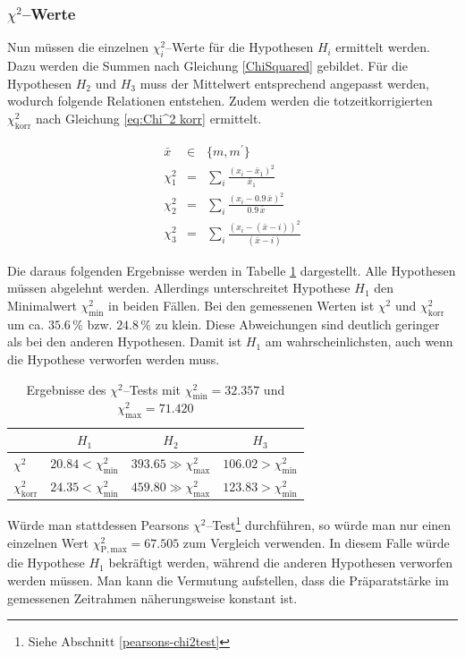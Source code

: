 \documentclass[12pt,a4paper]{scrartcl}
\numberwithin{equation}{section} %
\begin{document}
\subsubsection{$\chi^2$--Werte}
Nun müssen die einzelnen $\chi^2_i$--Werte für die Hypothesen $H_i$ ermittelt werden. Dazu werden die Summen nach Gleichung \eqref{ChiSquared} gebildet. Für die Hypothesen $H_2$ und $H_3$ muss der Mittelwert entsprechend angepasst werden, wodurch folgende Relationen entstehen. Zudem werden die totzeitkorrigierten $\chi^2_\mathrm{korr}$ nach Gleichung \eqref{eq:Chi^2 korr} ermittelt.

\begin{eqnarray}
	\bar x &\in& \{m, m^\prime\} \\
	\chi^2_1 &=& \sum_i \frac{(x_i-\bar x_1)^2}{\bar x_1} \\
	\chi^2_2 &=& \sum_i \frac{(x_i-0.9\,\bar x)^2}{0.9\,\bar x} \\
	\chi^2_3 &=& \sum_i \frac{(x_i-(\bar{x} - i))^2}{(\bar{x} - i)}
\end{eqnarray}

\noindent
Die daraus folgenden Ergebnisse werden in Tabelle \ref{tab:ChiSquared} dargestellt. Alle Hypothesen müssen abgelehnt werden. Allerdings unterschreitet Hypothese $H_1$ den Minimalwert $\chi^2_\mathrm{min}$ in beiden Fällen. Bei den gemessenen Werten ist $\chi^2$ und $\chi^2_\mathrm{korr}$ um ca. $35.6\,\%$ bzw. $24.8\,\%$ zu klein. Diese Abweichungen sind deutlich geringer als bei den anderen Hypothesen. Damit ist $H_1$ am wahrscheinlichsten, auch wenn die Hypothese verworfen werden muss.

\begin{table}[h]
	\centering
	\begin{tabular}{l|c|c|c}
			& $H_1$
			& $H_2$
			& $H_3$ \\
		\hline
		$\chi^2$
			& $20.84 < \chi^2_\mathrm{min}$
			& $393.65 \gg \chi^2_\mathrm{max}$
			& $106.02 > \chi^2_\mathrm{min}$
		\\
		$\chi^2_\mathrm{korr}$
			& $24.35 < \chi^2_\mathrm{min}$
			& $459.80 \gg \chi^2_\mathrm{max}$
			& $123.83 > \chi^2_\mathrm{min}$
	\end{tabular}
	\caption{Ergebnisse des $\chi^2$--Tests mit $\chi^2_\mathrm{min} = 32.357$ und $\chi^2_\mathrm{max} = 71.420$ \cite{Kapur}}
	\label{tab:ChiSquared}
\end{table}

\noindent
Würde man stattdessen Pearsons $\chi^2$--Test\footnote{Siehe Abschnitt \ref{pearsons-chi2test}} durchführen, so würde man nur einen einzelnen Wert $\chi_\mathrm{P, max}^2 = 67.505$ zum Vergleich verwenden. \cite{Kapur} In diesem Falle würde die Hypothese $H_1$ bekräftigt werden, während die anderen Hypothesen verworfen werden müssen. Man kann die Vermutung aufstellen, dass die Präparatstärke im gemessenen Zeitrahmen näherungsweise konstant ist.
\end{document}
